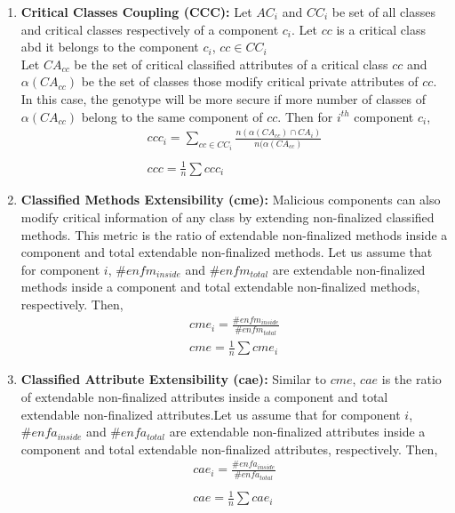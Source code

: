 \documentclass[letterpaper, 10 pt, conference]{ieeeconf}  %
\begin{document}
\begin{enumerate}
\item \textbf{Critical Classes Coupling (CCC):} Let  $AC_{i}$ and $CC_{i}$ be set of all classes and critical classes respectively of a component $c_{i}$. Let $cc$ is a critical class abd it belongs to the component $c_{i}$, $cc \in CC_{i}$ \\
Let $CA_{cc}$ be the set of critical classified attributes of a critical class $cc$ and $\alpha(CA_{cc})$ be the set of classes those modify critical private attributes of $cc$. In this case, the genotype will be more secure if  more number of classes of $\alpha(CA_{cc})$ belong to the same component of $cc$. Then for $i^{th}$ component $c_i$,
\begin{equation}\label{ccc_eq}
 \begin{array}{l}
ccc_{i}=\sum_{cc \in CC_{i}}{\frac{n(\alpha(CA_{cc}) \cap CA_{i})}{n(\alpha(CA_{cc})}}\\\\
ccc=\frac{1}{n}\sum{ccc_{i}}
\end{array}
\end{equation}

\item \textbf{Classified Methods Extensibility (cme):} 
Malicious components can also modify critical information of any class by extending non-finalized classified methods. This metric is the ratio of extendable non-finalized methods inside a component and total extendable non-finalized methods. Let us assume that for component $i$, $\#enfm_{inside}$ and $\#enfm_{total}$ are  extendable non-finalized methods inside a component and total extendable non-finalized methods, respectively. Then,
\begin{equation}\label{cme_eq}
 \begin{array}{l}
cme_{i}=\frac{\#enfm_{inside}}{\#enfm_{total}} \\
cme=\frac{1}{n}\sum{cme_i}
\end{array}
\end{equation}


\item \textbf{Classified Attribute Extensibility (cae):}
Similar to $cme$, $cae$ is the ratio of extendable non-finalized attributes inside a component and total extendable non-finalized attributes.Let us assume that for component $i$, $\#enfa_{inside}$ and $\#enfa_{total}$ are  extendable non-finalized attributes inside a component and total extendable non-finalized attributes, respectively. Then,
\begin{equation}\label{cae_eq}
 \begin{array}{l}
cae_{i}=\frac{\#enfa_{inside}}{\#enfa_{total}} \\\\
cae=\frac{1}{n}\sum{cae_i}
\end{array}
\end{equation}


  
\end{enumerate}
 
\end{document}
